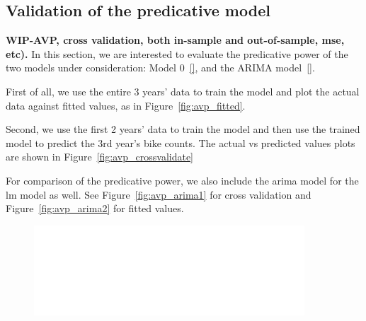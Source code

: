 \documentclass [11pt, proquest] {uwthesis}[2015/03/03]
\begin{document}
\subsection{Validation of the predicative model}
\textbf{WIP-AVP, cross validation, both in-sample and out-of-sample, mse, etc).}
In this section, we are interested to evaluate the predicative power of the two models under consideration: Model 0~\eqref{}, and the ARIMA model~\eqref{}.

First of all, we use the entire 3 years' data to train the model and plot the actual data against fitted values, as in Figure~\ref{fig:avp_fitted}.

Second, we use the first 2 years' data to train the model and then use the trained model to predict the 3rd year's bike counts. The actual vs predicted values plots are shown in Figure~\ref{fig:avp_crossvalidate}



For comparison of the predicative power, we also include the arima model for the lm model as well. See Figure~\ref{fig:avp_arima1} for cross validation and Figure~\ref{fig:avp_arima2} for fitted values.


%

\begin{figure}
\centering
   \includegraphics[width=0.9\textwidth]{figures/prediction/actualvsfited_arima} 
  \caption{}
  \label{fig:arima1}
\end{figure}
\end{document}
